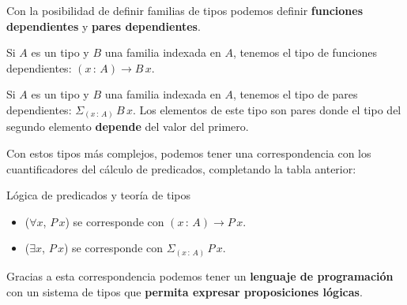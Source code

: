 \documentclass[xcolor=dvipsnames]{beamer} %
\newcommand{\tjud}[2]
  {\ensuremath{#1\,:\,#2}}
\newcommand{\depPair}[3]
 {\ensuremath{\Sigma_{(\tjud{#1}{#2})}\,#3\,#1}
 }
\begin{document}
\begin{frame}
 \begin{block}{}
  Con la posibilidad de definir familias de tipos podemos definir \textbf{funciones dependientes} y \textbf{pares dependientes}.
 \end{block}
 
 \pause
 
 \begin{block}{}
  Si $A$ es un tipo y $B$ una familia indexada en $A$, tenemos el tipo de funciones dependientes:
  $(\tjud{x}{A}) \rightarrow B\,x$.
 \end{block}
 
 \pause
 
 \begin{block}{}
  Si $A$ es un tipo y $B$ una familia indexada en $A$, tenemos el tipo de pares dependientes:
  $\depPair{x}{A}{B}$. Los elementos de este tipo son pares donde el tipo del segundo elemento \textbf{depende}
  del valor del primero.
 \end{block} 
 
\end{frame}


\begin{frame}
 
   \begin{block}{}
  Con estos tipos más complejos, podemos tener una correspondencia con los cuantificadores del cálculo
  de predicados, completando la tabla anterior:
 \end{block}

 \pause

  \begin{block}{Lógica de predicados y teoría de tipos}
   \begin{itemize}
    \item ($\forall x$, $P\,x$) se corresponde con $(\tjud{x}{A}) \rightarrow P\,x$.
    \item ($\exists x$, $P\,x$) se corresponde con $\depPair{x}{A}{P}$.
    \end{itemize}
  \end{block}

  \pause
  
  \begin{block}{}
   Gracias a esta correspondencia podemos tener un \textbf{lenguaje de programación} con un sistema
   de tipos que \textbf{permita expresar proposiciones lógicas}.
  \end{block}

\end{frame}
\end{document}
